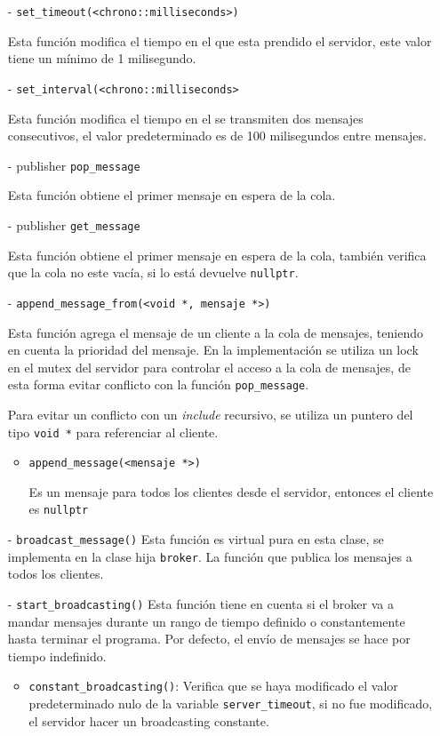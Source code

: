 \begin{itemize}
    \item[-] \verb|set_timeout(<chrono::milliseconds>)|
    
    Esta función modifica el tiempo en el que esta prendido el servidor, este valor tiene un mínimo de 1 milisegundo.

    \item[-] \verb|set_interval(<chrono::milliseconds>|
    
    Esta función modifica el tiempo en el se transmiten dos mensajes consecutivos, el valor predeterminado es de 100 milisegundos entre mensajes.
    
    \item[-] publisher \verb|pop_message|
    
    Esta función obtiene el primer mensaje en espera de la cola.

    \item[-] publisher \verb|get_message|
    
    Esta función obtiene el primer mensaje en espera de la cola, también verifica que la cola no este vacía, si lo está devuelve \verb|nullptr|.
    
    \item[-] \verb|append_message_from(<void *, mensaje *>)|
    
    Esta función agrega el mensaje de un cliente a la cola de mensajes, teniendo en cuenta la prioridad del mensaje. En la implementación se utiliza un lock en el mutex del servidor para controlar el acceso a la cola de mensajes,  de esta forma evitar conflicto con la función \verb|pop_message|.

    Para evitar un conflicto con un \emph{include} recursivo, se utiliza un puntero del tipo \verb|void *| para referenciar al cliente.

    \begin{itemize}
        \item \verb|append_message(<mensaje *>)|
    
        Es un mensaje para todos los clientes desde el servidor, entonces el cliente es \verb|nullptr|
    \end{itemize}
    
    \item[-] \verb|broadcast_message()|
    Esta función es virtual pura en esta clase, se implementa en la clase hija \verb|broker|.  La función que publica los mensajes a todos los clientes.

    \item[-] \verb|start_broadcasting()|
    Esta función tiene en cuenta si el broker va a mandar mensajes durante un rango de tiempo  definido o constantemente hasta terminar el programa. Por defecto, el envío de mensajes se hace por tiempo indefinido.
    \begin{itemize}
        \item \verb|constant_broadcasting()|: 
        Verifica que se haya modificado el valor predeterminado nulo de la variable \verb|server_timeout|, si no fue modificado, el servidor hacer un broadcasting constante.


\end{itemize}
\end{itemize}

